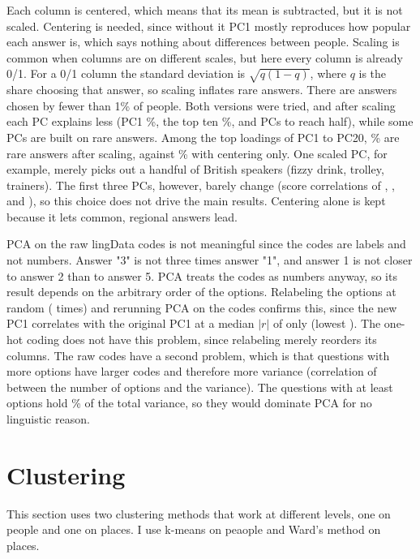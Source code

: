 \documentclass[10pt,letterpaper]{article}
\begin{document}
Each column is centered, which means that its mean is subtracted, but it is not scaled. Centering is needed, since without it PC1 mostly reproduces how popular each answer is, which says nothing about differences between people. Scaling is common when columns are on different scales, but here every column is already 0/1. For a 0/1 column the standard deviation is $\sqrt{q(1-q)}$, where $q$ is the share choosing that answer, so scaling inflates rare answers. There are \drNRare{} answers chosen by fewer than 1\% of people. Both versions were tried, and after scaling each PC explains less (PC1 \drVarScaledPCOne\%, the top ten \drVarScaledTopTen\%, and \drNPCsHalfScaled{} PCs to reach half), while some PCs are built on rare answers. Among the top loadings of PC1 to PC20, \drRareTopScaled\% are rare answers after scaling, against \drRareTopCentered\% with centering only. One scaled PC, for example, merely picks out a handful of British speakers (fizzy drink, trolley, trainers). The first three PCs, however, barely change (score correlations of \drScaledCorrPCOne, \drScaledCorrPCTwo, and \drScaledCorrPCThree), so this choice does not drive the main results. Centering alone is kept because it lets common, regional answers lead.

PCA on the raw lingData codes is not meaningful since the codes are labels and not numbers. Answer "3" is not three times answer "1", and answer 1 is not closer to answer 2 than to answer 5. PCA treats the codes as numbers anyway, so its result depends on the arbitrary order of the options. Relabeling the options at random (\drNPerm{} times) and rerunning PCA on the codes confirms this, since the new PC1 correlates with the original PC1 at a median $|r|$ of only \drPermCorrMedian{} (lowest \drPermCorrMin). The one-hot coding does not have this problem, since relabeling merely reorders its columns. The raw codes have a second problem, which is that questions with more options have larger codes and therefore more variance (correlation of \drCorrOptionsVar{} between the number of options and the variance). The \drNManyOptions{} questions with at least \drManyOptions{} options hold \drShareVarManyOptions\% of the total variance, so they would dominate PCA for no linguistic reason.

\section{Clustering}\label{clustering}

This section uses two clustering methods that work at different levels, one on people and one on places. I use k-means on peaople and Ward's method on places.
\end{document}

